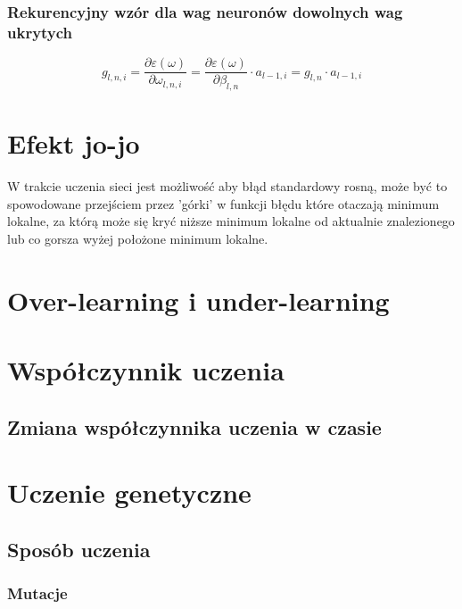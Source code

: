 \documentclass[]{article}
\begin{document}
		\subsubsection{Rekurencyjny wzór dla wag neuronów dowolnych wag ukrytych}
		
		\begin{equation} \label{eq:gradientweighthidden}
			g_{l,n,i} = \frac{ \partial \varepsilon\left( \omega \right) }{ \partial \omega_{l,n,i} } = \frac{ \partial \varepsilon\left( \omega \right) }{ \partial \beta_{l,n} } \cdot a_{l-1,i} = g_{l,n} \cdot a_{l-1,i}
		\end{equation}
		
		
		
		
		

\newpage
\section{Efekt jo-jo}
	W trakcie uczenia sieci jest możliwość aby błąd standardowy rosną, może być to spowodowane przejściem przez 'górki' w funkcji błędu które otaczają minimum lokalne, za którą może się kryć niższe minimum lokalne od aktualnie znalezionego lub co gorsza wyżej położone minimum lokalne.

\newpage
\section{Over-learning i under-learning} \label{chapter:overunderlearing}

\newpage
\section{Współczynnik uczenia} \label{chapter:learningfactor}
	\subsection{Zmiana współczynnika uczenia w czasie}

\newpage
\section{Uczenie genetyczne}
	\subsection{Sposób uczenia}
		\subsubsection{Mutacje}
\end{document}
